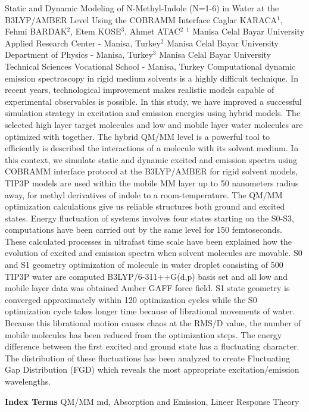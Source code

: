 
    \begin{abstract_online}{Static and Dynamic Modeling of N-Methyl-Indole \newline\noindent (N=1-6) in Water at the B3LYP/AMBER Level Using the COBRAMM Interface}{%
        Caglar KARACA$^{1}$, Fehmi BARDAK$^{2}$, Etem KOSE$^{3}$, Ahmet ATAC$^{2}$}{%
        }{%
        $^1$ Manisa Celal Bayar University Applied Research Center - Manisa, Turkey\newline{}$^2$ Manisa Celal Bayar University Department of Physics - Manisa, Turkey\newline{}$^3$ Manisa Celal Bayar University Technical Sciences Vocational School - Manisa, Turkey}
    Computational dynamic emission spectroscopy in rigid medium solvents is a highly difficult technique. In recent years, technological improvement makes realistic models capable of experimental observables is possible. In this study, we have improved a successful simulation strategy in excitation and emission energies using hybrid models. The selected high layer target molecules and low and mobile layer water molecules are optimized with together. The hybrid QM/MM level is a powerful tool to efficiently is described the interactions of a molecule with its solvent medium. In this context, we simulate static and dynamic excited and emission spectra using COBRAMM interface protocol at the B3LYP/AMBER for rigid solvent models, TIP3P models are used within the mobile MM layer up to 50 nanometers radius away, for methyl derivatives of indole to a room-temperature. The QM/MM optimization calculations give us reliable structures both ground and excited states. Energy fluctuation of systems involves four states starting on the S0-S3, computations have been carried out by the same level for 150 femtoseconds. These calculated processes in ultrafast time scale have been explained how the evolution of excited and emission spectra when solvent molecules are movable. S0 and S1 geometry optimization of molecule in water droplet consisting of 500 TIP3P water are computed B3LYP/6-311++G(d,p) basis set and all low and mobile layer data was obtained Amber GAFF force field. S1 state geometry is converged approximately within 120 optimization cycles while the S0 optimization cycle takes longer time because of librational movements of water. Because this librational motion causes chaos at the RMS/D value, the number of mobile molecules has been reduced from the optimization steps. The energy difference between the first excited and ground state has a fluctuating character. The distribution of these fluctuations has been analyzed to create Fluctuating Gap Distribution (FGD) which reveals the most appropriate excitation/emission wavelengths. 
    
            \textbf{Index Terms} \newline{}QM/MM md, Absorption and Emission, Lineer Response Theory
    \end{abstract_online}
    